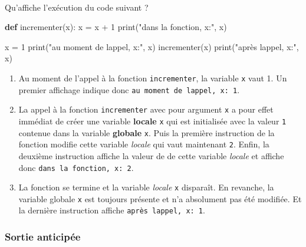 \documentclass[a4paper,17pt]{extarticle}
\newenvironment{eleve}%
{\begin{activite}\color{noiramu}\\[-0.5cm]}
{\end{activite}}
\providecommand{\tightlist}{%
      \setlength{\itemsep}{0pt}\setlength{\parskip}{0pt}}
\newenvironment{Shaded}{}{}
\newcommand{\KeywordTok}[1]{\textcolor[rgb]{0.00,0.44,0.13}{\textbf{{#1}}}}
\newcommand{\DecValTok}[1]{\textcolor[rgb]{0.25,0.63,0.44}{{#1}}}
\newcommand{\StringTok}[1]{\textcolor[rgb]{0.25,0.44,0.63}{{#1}}}
\newcommand{\NormalTok}[1]{{#1}}
\newcommand{\OperatorTok}[1]{\textcolor[rgb]{0.40,0.40,0.40}{{#1}}}
\newcommand{\BuiltInTok}[1]{{#1}}
\begin{document}
\begin{remarque}
        \end{remarque}\begin{eleve}
    Qu'affiche l'exécution du code suivant ?

\begin{Shaded}
\begin{Highlighting}[]
\KeywordTok{def}\NormalTok{ incrementer(x):}
\NormalTok{    x }\OperatorTok{=}\NormalTok{ x }\OperatorTok{+} \DecValTok{1}
    \BuiltInTok{print}\NormalTok{(}\StringTok{"dans la fonction, x:"}\NormalTok{, x)}

\NormalTok{x }\OperatorTok{=} \DecValTok{1}
\BuiltInTok{print}\NormalTok{(}\StringTok{"au moment de l\textquotesingle{}appel, x:"}\NormalTok{, x)}
\NormalTok{incrementer(x)}
\BuiltInTok{print}\NormalTok{(}\StringTok{"après l\textquotesingle{}appel, x:"}\NormalTok{, x)}
\end{Highlighting}
\end{Shaded}
        
        \end{eleve}\begin{reponse}
    \begin{enumerate}
\def\labelenumi{\arabic{enumi}.}
\tightlist
\item
  Au moment de l'appel à la fonction \texttt{incrementer}, la variable
  \texttt{x} vaut 1. Un premier affichage indique donc
  \texttt{au\ moment\ de\ l\textquotesingle{}appel,\ x:\ 1}.
\item
  La appel à la fonction \texttt{incrementer} avec pour argument
  \texttt{x} a pour effet immédiat de créer une variable \textbf{locale}
  \texttt{x} qui est initialisée avec la valeur \texttt{1} contenue dans
  la variable \textbf{globale} \texttt{x}. Puis la première instruction
  de la fonction modifie cette variable \emph{locale} qui vaut
  maintenant \texttt{2}. Enfin, la deuxième instruction affiche la
  valeur de de cette variable \emph{locale} et affiche donc
  \texttt{dans\ la\ fonction,\ x:\ 2}.
\item
  La fonction se termine et la variable \emph{locale} \texttt{x}
  disparaît. En revanche, la variable globale \texttt{x} est toujours
  présente et n'a absolument pas été modifiée. Et la dernière
  instruction affiche \texttt{après\ l\textquotesingle{}appel,\ x:\ 1}.
\end{enumerate}

        \end{reponse}
    \hypertarget{sortie-anticipuxe9e}{%
\subsubsection{Sortie anticipée}\label{sortie-anticipuxe9e}}
\end{document}
